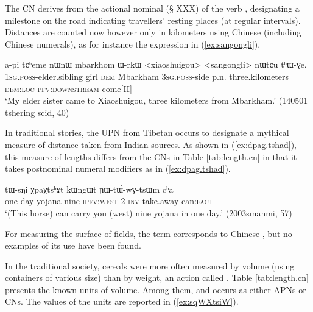The CN  derives from the  actional nominal (§ XXX) of the verb , designating a milestone on the road indicating travellers' resting places (at regular intervals). Distances are counted now however only in kilometers using Chinese (including Chinese numerals), as for instance the expression   in (\ref{ex:sangongli}).

\begin{exe}
\ex \label{ex:sangongli} 
\gll a-pi tɕʰeme nɯnɯ mbarkhom ɯ-rkɯ <xiaoshuigou> <sangongli> nɯtɕu tʰɯ-ɣe. \\
\textsc{1sg}.\textsc{poss}-elder.sibling girl \textsc{dem} Mbarkham \textsc{3sg}.\textsc{poss}-side p.n. three.kilometers \textsc{dem}:\textsc{loc} \textsc{pfv}:\textsc{downstream}-come[II] \\
\glt  `My elder sister came to Xiaoshuigou, three kilometers from Mbarkham.' (140501 tshering scid, 40)
\end{exe}

In traditional stories, the UPN  from Tibetan  occurs to designate a mythical measure of distance taken from Indian sources. As shown in (\ref{ex:dpag.tshad}), this measure of lengths differs from the CNs in Table \ref{tab:length.cn} in that it takes postnominal numeral modifiers as in (\ref{ex:dpag.tshad}).

\begin{exe}
\ex \label{ex:dpag.tshad}
\gll  tɯ-sŋi χpaχtsʰɤt kɯngɯt ɲɯ-tɯ́-wɣ-tsɯm cʰa \\
one-day yojana nine \textsc{ipfv}:\textsc{west}-2-\textsc{inv}-take.away can:\textsc{fact} \\
\glt `(This horse) can carry you (west) nine yojana in one day.'  (2003smanmi, 57)
\end{exe}

For measuring the surface of fields, the term  corresponds to Chinese , but no examples of its use have been found.

In the traditional society, cereals were more often measured by volume (using containers of various size) than by weight, an action called . Table \ref{tab:length.cn} presents the known units of volume. Among them,  and   occurs as either APNs or CNs. The values of the units are reported in (\ref{ex:sqWXtsiW}). 


